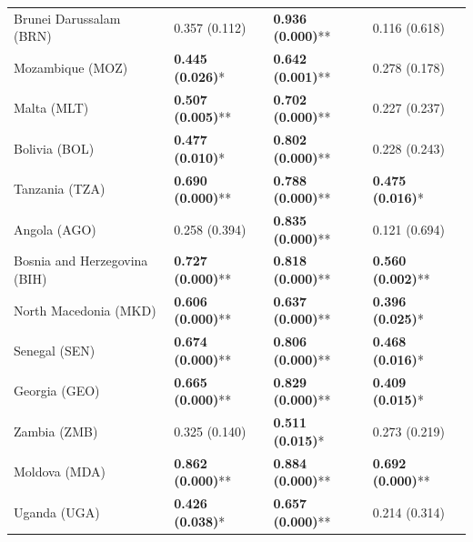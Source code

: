 \begin{longtable}{p{5cm}p{3cm}p{3cm}p{5cm}}
Brunei Darussalam (BRN) & \textcolor{atlOrange600}{0.357 (0.112)} & \textcolor{atlLime600}{\textbf{0.936 (0.000)}**} & \textcolor{atlOrange600}{0.116 (0.618)} \\
Mozambique (MOZ) & \textcolor{atlLime600}{\textbf{0.445 (0.026)}*} & \textcolor{atlLime600}{\textbf{0.642 (0.001)}**} & \textcolor{atlOrange600}{0.278 (0.178)} \\
Malta (MLT) & \textcolor{atlLime600}{\textbf{0.507 (0.005)}**} & \textcolor{atlLime600}{\textbf{0.702 (0.000)}**} & \textcolor{atlOrange600}{0.227 (0.237)} \\
Bolivia (BOL) & \textcolor{atlLime600}{\textbf{0.477 (0.010)}*} & \textcolor{atlLime600}{\textbf{0.802 (0.000)}**} & \textcolor{atlOrange600}{0.228 (0.243)} \\
Tanzania (TZA) & \textcolor{atlLime600}{\textbf{0.690 (0.000)}**} & \textcolor{atlLime600}{\textbf{0.788 (0.000)}**} & \textcolor{atlLime600}{\textbf{0.475 (0.016)}*} \\
Angola (AGO) & \textcolor{atlOrange600}{0.258 (0.394)} & \textcolor{atlLime600}{\textbf{0.835 (0.000)}**} & \textcolor{atlOrange600}{0.121 (0.694)} \\
Bosnia and Herzegovina (BIH) & \textcolor{atlLime600}{\textbf{0.727 (0.000)}**} & \textcolor{atlLime600}{\textbf{0.818 (0.000)}**} & \textcolor{atlLime600}{\textbf{0.560 (0.002)}**} \\
North Macedonia (MKD) & \textcolor{atlLime600}{\textbf{0.606 (0.000)}**} & \textcolor{atlLime600}{\textbf{0.637 (0.000)}**} & \textcolor{atlLime600}{\textbf{0.396 (0.025)}*} \\
Senegal (SEN) & \textcolor{atlLime600}{\textbf{0.674 (0.000)}**} & \textcolor{atlLime600}{\textbf{0.806 (0.000)}**} & \textcolor{atlLime600}{\textbf{0.468 (0.016)}*} \\
Georgia (GEO) & \textcolor{atlLime600}{\textbf{0.665 (0.000)}**} & \textcolor{atlLime600}{\textbf{0.829 (0.000)}**} & \textcolor{atlLime600}{\textbf{0.409 (0.015)}*} \\
Zambia (ZMB) & \textcolor{atlOrange600}{0.325 (0.140)} & \textcolor{atlLime600}{\textbf{0.511 (0.015)}*} & \textcolor{atlOrange600}{0.273 (0.219)} \\
Moldova (MDA) & \textcolor{atlLime600}{\textbf{0.862 (0.000)}**} & \textcolor{atlLime600}{\textbf{0.884 (0.000)}**} & \textcolor{atlLime600}{\textbf{0.692 (0.000)}**} \\
Uganda (UGA) & \textcolor{atlLime600}{\textbf{0.426 (0.038)}*} & \textcolor{atlLime600}{\textbf{0.657 (0.000)}**} & \textcolor{atlOrange600}{0.214 (0.314)} \\

\end{longtable}
